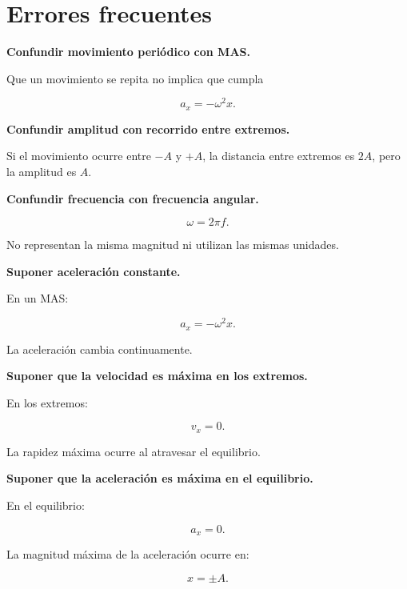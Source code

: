 \section{Errores frecuentes}

\begin{errorfrecuente}
\textbf{Confundir movimiento periódico con MAS.}

Que un movimiento se repita no implica que cumpla

\[ a_x=-\omega^2x. \]
\end{errorfrecuente}

\begin{errorfrecuente}
\textbf{Confundir amplitud con recorrido entre extremos.}

Si el movimiento ocurre entre \(-A\) y \(+A\), la distancia entre extremos es \(2A\), pero la amplitud es \(A\).
\end{errorfrecuente}

\begin{errorfrecuente}
\textbf{Confundir frecuencia con frecuencia angular.}

\[ \omega=2\pi f. \]

No representan la misma magnitud ni utilizan las mismas unidades.
\end{errorfrecuente}

\begin{errorfrecuente}
\textbf{Suponer aceleración constante.}

En un MAS:

\[ a_x=-\omega^2x. \]

La aceleración cambia continuamente.
\end{errorfrecuente}

\begin{errorfrecuente}
\textbf{Suponer que la velocidad es máxima en los extremos.}

En los extremos:

\[ v_x=0. \]

La rapidez máxima ocurre al atravesar el equilibrio.
\end{errorfrecuente}

\begin{errorfrecuente}
\textbf{Suponer que la aceleración es máxima en el equilibrio.}

En el equilibrio:

\[ a_x=0. \]

La magnitud máxima de la aceleración ocurre en:

\[ x=\pm A. \]
\end{errorfrecuente}

